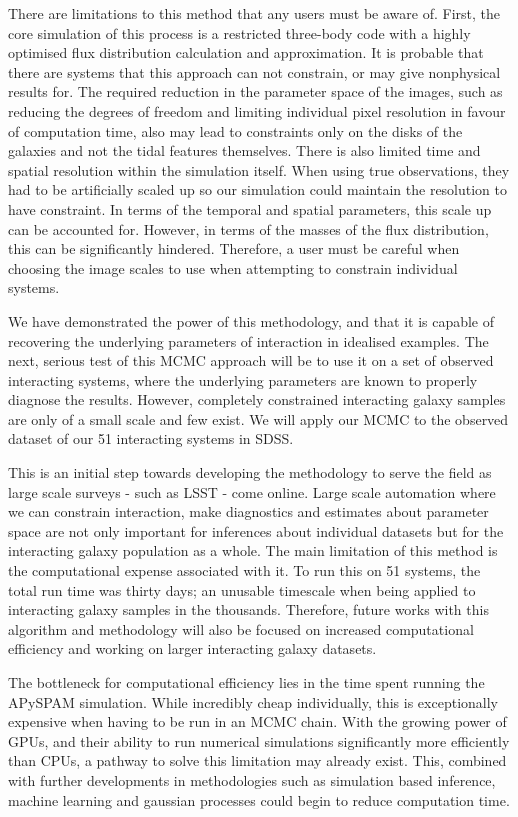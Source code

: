 There are limitations to this method that any users must be aware of. First, the core simulation of this process is a restricted three-body code with a highly optimised flux distribution calculation and approximation. It is probable that there are systems that this approach can not constrain, or may give nonphysical results for. The required reduction in the parameter space of the images, such as reducing the degrees of freedom and limiting individual pixel resolution in favour of computation time, also may lead to constraints only on the disks of the galaxies and not the tidal features themselves. There is also limited time and spatial resolution within the simulation itself. When using true observations, they had to be artificially scaled up so our simulation could maintain the resolution to have constraint. In terms of the temporal and spatial parameters, this scale up can be accounted for. However, in terms of the masses of the flux distribution, this can be significantly hindered. Therefore, a user must be careful when choosing the image scales to use when attempting to constrain individual systems. 

We have demonstrated the power of this methodology, and that it is capable of recovering the underlying parameters of interaction in idealised examples. The next, serious test of this MCMC approach will be to use it on a set of observed interacting systems, where the underlying parameters are known to properly diagnose the results. However, completely constrained interacting galaxy samples are only of a small scale and few exist. We will apply our MCMC to the observed dataset of our 51 interacting systems in SDSS.

This is an initial step towards developing the methodology to serve the field as large scale surveys - such as LSST - come online. Large scale automation where we can constrain interaction, make diagnostics and estimates about parameter space are not only important for inferences about individual datasets but for the interacting galaxy population as a whole. The main limitation of this method is the computational expense associated with it. To run this on 51 systems, the total run time was thirty days; an unusable timescale when being applied to interacting galaxy samples in the thousands. Therefore, future works with this algorithm and methodology will also be focused on increased computational efficiency and working on larger interacting galaxy datasets. 

The bottleneck for computational efficiency lies in the time spent running the APySPAM simulation. While incredibly cheap individually, this is exceptionally expensive when having to be run in an MCMC chain. With the growing power of GPUs, and their ability to run numerical simulations significantly more efficiently than CPUs, a pathway to solve this limitation may already exist. This, combined with further developments in methodologies such as simulation based inference, machine learning and gaussian processes could begin to reduce computation time.
